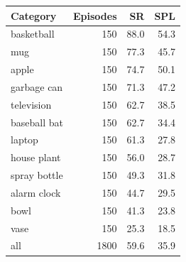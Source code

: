 \begin{tabular}{@{}lrrr@{}}
\toprule
Category & Episodes & SR & SPL\\
\midrule
basketball & 150 & 88.0 & 54.3\\
mug & 150 & 77.3 & 45.7\\
apple & 150 & 74.7 & 50.1\\
garbage can & 150 & 71.3 & 47.2\\
television & 150 & 62.7 & 38.5\\
baseball bat & 150 & 62.7 & 34.4\\
laptop & 150 & 61.3 & 27.8\\
house plant & 150 & 56.0 & 28.7\\
spray bottle & 150 & 49.3 & 31.8\\
alarm clock & 150 & 44.7 & 29.5\\
bowl & 150 & 41.3 & 23.8\\
vase & 150 & 25.3 & 18.5\\
\midrule
all & 1800 & 59.6 & 35.9\\
\bottomrule
\end{tabular}
